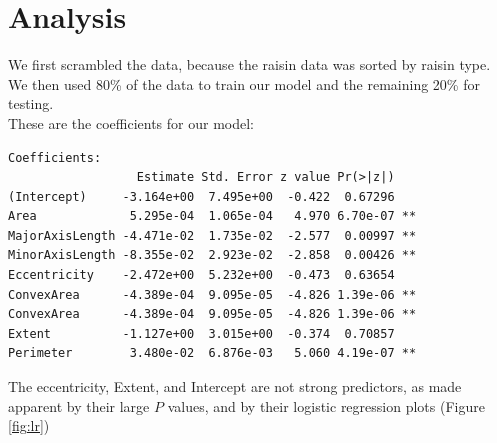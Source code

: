 \documentclass{article}
\begin{document}
\section{Analysis}
We first scrambled the data, because the raisin data was sorted by raisin type. We then used 80\% of the data to train our model and the remaining 20\% for testing. \\
These are the coefficients for our model:
\begin{verbatim}
Coefficients:
                  Estimate Std. Error z value Pr(>|z|)   
(Intercept)     -3.164e+00  7.495e+00  -0.422  0.67296   
Area             5.295e-04  1.065e-04   4.970 6.70e-07 **
MajorAxisLength -4.471e-02  1.735e-02  -2.577  0.00997 **
MinorAxisLength -8.355e-02  2.923e-02  -2.858  0.00426 **
Eccentricity    -2.472e+00  5.232e+00  -0.473  0.63654   
ConvexArea      -4.389e-04  9.095e-05  -4.826 1.39e-06 **
ConvexArea      -4.389e-04  9.095e-05  -4.826 1.39e-06 **
Extent          -1.127e+00  3.015e+00  -0.374  0.70857   
Perimeter        3.480e-02  6.876e-03   5.060 4.19e-07 **
\end{verbatim}
The eccentricity, Extent, and Intercept are not strong predictors, as made apparent by their large $P$ values, and by their logistic regression plots (Figure \ref{fig:lr})
\clearpage
\end{document}
